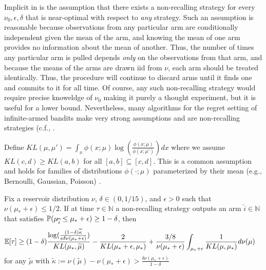Implicit in \cite{malloy2012quickest} is the assumption that there exists a non-recalling strategy for every $\nu_0, \epsilon, \delta$ that is near-optimal with respect to \emph{any} strategy.
Such an assumption is reasonable because observations from any particular arm are conditionally independent given the mean of the arm, and knowing the mean of one arm provides no information about the mean of another. 
Thus, the number of times any particular arm is pulled depends \emph{only} on the observations from that arm, and because the means of the arms are drawn iid from $\nu$, each arm should be treated identically.
Thus, the procedure will continue to discard arms until it finds one and commits to it for all time. 
Of course, any such non-recalling strategy would require precise knoweldge of $\nu_0$ making it purely a thought experiment, but it is useful for a lower bound.
Nevertheless, many algorithms for the regret setting of infinite-armed bandits make very strong assumptions and are non-recalling strategies (c.f., \cite{berry1997,bonald2013two,Chan2018Infinite}.

Define
$KL(\mu,\mu') = \int_{x} \phi(x;\mu) \log\left( \frac{\phi(x;\mu)}{\phi(x;\mu')}\right) dx$
where we assume $KL(c,d) \geq KL(a,b)$ for all $[a,b] \subseteq [c,d]$.
This is a common assumption and holds for families of distributions $\phi( \cdot ; \mu)$ parameterized by their mean (e.g., Bernoulli, Gaussian, Poisson) \cite{kaufmann2016complexity}.
\begin{theorem}\label{thm:fb-lb}
Fix a reservoir distribution $\nu$, $\delta \in (0,1/15)$, and $\epsilon >0$ such that $\nu(\mu_*+\epsilon) \leq 1/2$.
If at time $\tau \in \mathbb{N}$ a non-recalling strategy outputs an arm $\widehat{i} \in \mathbb{N}$ that satisfies $\P(\mu_{\widehat{i}} \leq \mu_* + \epsilon ) \geq 1-\delta$, then
\begin{align*}
\E[ \tau ] &\geq (1-\delta)\frac{  \log(\tfrac{(1-\delta)\widetilde{\kappa}}{e \delta \nu(\mu_*+\epsilon)})}{KL(\mu_* , \widetilde{\mu})}  - \frac{2}{KL(\mu_* + \epsilon, \mu_*)}  + \frac{3/8}{\nu(\mu_*+\epsilon)} \int_{\mu_*+\epsilon} \frac{1}{KL(\mu,\mu_*)} d\nu(\mu) 
\end{align*}
for any $\widetilde{\mu}$ with $\widetilde{\kappa} := \nu(\widetilde{\mu}) - \nu(\mu_*+\epsilon) > \frac{ \delta \nu(\mu_*+\epsilon)}{1-\delta}$
\end{theorem}


